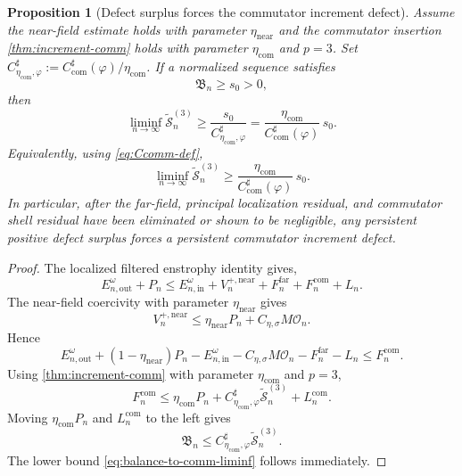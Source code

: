 \documentclass[11pt]{article}
\numberwithin{equation}{section}
\theoremstyle{plain}
\newtheorem{proposition}[theorem]{Proposition}
\theoremstyle{definition}
\theoremstyle{remark}
\begin{document}
\begin{proposition}[Defect surplus forces the commutator increment defect]\label{prop:balance-to-comm-young}
Assume the near-field estimate holds with parameter $\eta_{\mathrm{near}}$ and the commutator insertion \cref{thm:increment-comm} holds with parameter $\eta_{\mathrm{com}}$ and $p=3$.  Set $C_{\eta_{\mathrm{com}},\varphi}^{\sharp}:=C_{\mathrm{com}}^{\sharp}(\varphi)/\eta_{\mathrm{com}}$.  If a normalized sequence satisfies
\[
\mathfrak B_n\ge s_0>0,
\]
then
\begin{equation}\label{eq:balance-to-comm-liminf}
\liminf_{n\to\infty}\widetilde{\mathcal S}_n^{(3)}
\ge
\frac{s_0}{C_{\eta_{\mathrm{com}},\varphi}^{\sharp}}
=
\frac{\eta_{\mathrm{com}}}{C_{\mathrm{com}}^{\sharp}(\varphi)}\,s_0.
\end{equation}
Equivalently, using \eqref{eq:Ccomm-def},
\begin{equation}\label{eq:balance-to-comm-explicit}
\liminf_{n\to\infty}\widetilde{\mathcal S}_n^{(3)}
\ge
\frac{\eta_{\mathrm{com}}}{C_{\mathrm{com}}^{\sharp}(\varphi)}\,s_0.
\end{equation}
In particular, after the far-field, principal localization residual, and commutator shell residual have been eliminated or shown to be negligible, any persistent positive defect surplus forces a persistent commutator increment defect.
\end{proposition}

\begin{proof}
The localized filtered enstrophy identity gives, 
\[
E_{n,\mathrm{out}}^\omega+P_n
\le
E_{n,\mathrm{in}}^\omega
+V_n^{+,\mathrm{near}}
+F_n^{\mathrm{far}}
+F_n^{\mathrm{com}}
+L_n.
\]
The near-field coercivity with parameter $\eta_{\mathrm{near}}$ gives
\[
V_n^{+,\mathrm{near}}
\le
\eta_{\mathrm{near}}P_n
+
C_{\eta,\sigma}M\mathcal O_n.
\]
Hence
\[
E_{n,\mathrm{out}}^\omega
+(1-\eta_{\mathrm{near}})P_n
-
E_{n,\mathrm{in}}^\omega
-C_{\eta,\sigma}M\mathcal O_n
-F_n^{\mathrm{far}}
-L_n
\le
F_n^{\mathrm{com}}.
\]
Using \cref{thm:increment-comm} with parameter $\eta_{\mathrm{com}}$ and $p=3$,
\[
F_n^{\mathrm{com}}
\le
\eta_{\mathrm{com}}P_n
+
C_{\eta_{\mathrm{com}},\varphi}^{\sharp}\widetilde{\mathcal S}_n^{(3)}
+
L_n^{\mathrm{com}}.
\]
Moving $\eta_{\mathrm{com}}P_n$ and $L_n^{\mathrm{com}}$ to the left gives
\[
\mathfrak B_n
\le
C_{\eta_{\mathrm{com}},\varphi}^{\sharp}\widetilde{\mathcal S}_n^{(3)}.
\]
The lower bound \eqref{eq:balance-to-comm-liminf} follows immediately.
\end{proof}
\end{document}
